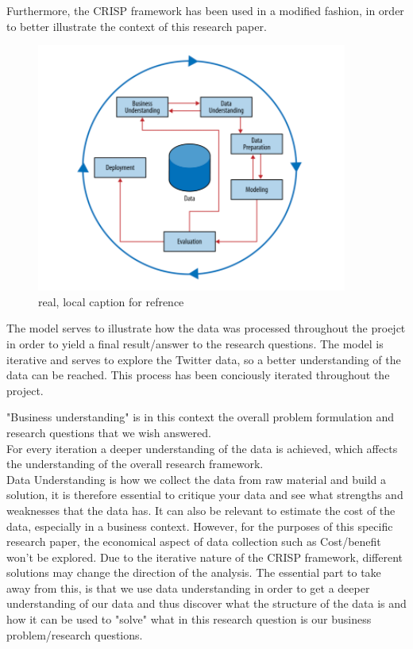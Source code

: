 \documentclass[11pt]{article}
\begin{document}
Furthermore,  the CRISP framework has been used in a modified fashion, in order to better illustrate the context of this research paper.\\

\begin{figure}[H] %
	\centering %
\includegraphics [scale= .95]  {CRISP.PNG}    %
	\caption[Optional caption] {real, local caption for refrence}
	\label{fig:wordcloudBliz}

\end{figure}


The model serves to illustrate how the data was processed throughout the proejct in order to yield a final result/answer to the research questions. The model is iterative and serves to explore the Twitter data, so a better
understanding of the data can be reached. This process has been conciously iterated throughout the project.

"Business understanding" is in this context the overall problem formulation and research questions that we wish answered.\\
For every iteration a deeper understanding of the data is achieved, which affects the understanding of the overall research framework.\\

Data Understanding is how we collect the data from raw material and build a solution, it is therefore essential to critique your data and see what strengths and weaknesses that the data has. It can also be relevant to estimate the cost of the data, especially in a business context. However, for the purposes of this specific research paper, the economical aspect of data collection such as Cost/benefit won't be explored. Due to the iterative nature of the CRISP framework, different solutions may change the direction of the analysis. The essential part to take away from this, is that we use data understanding in order to get a deeper understanding of our data and thus discover what the structure of the data is and how it can be used to "solve" what in this research question is our business problem/research questions.
\end{document}
